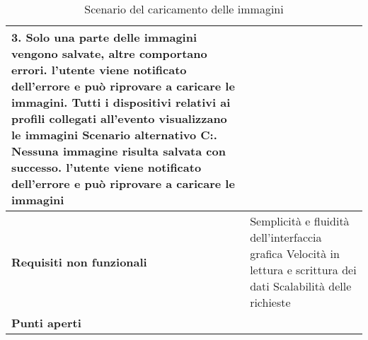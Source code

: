 \begin{table}[htb]
\begin{tabular} {|P{4.5cm}|P{11cm}|}
        3. Solo una parte delle immagini vengono salvate, altre comportano errori. l'utente viene notificato dell'errore e può riprovare a caricare le immagini. Tutti i dispositivi relativi ai profili collegati all'evento visualizzano le immagini\newline
        Scenario alternativo C:. Nessuna immagine risulta salvata con successo. l'utente viene notificato dell'errore e può riprovare a caricare le immagini                                     \\
        \hline
        \textbf{Requisiti non funzionali} & Semplicità e fluidità dell'interfaccia grafica   \linebreak
        Velocità in lettura e scrittura dei dati\linebreak
        Scalabilità delle richieste                                                                                         \\
        \hline
        \textbf{Punti aperti}             &                                                                                 \\
        \hline
    \end{tabular}

    \caption{Scenario del caricamento delle immagini}
\end{table}
\clearpage

